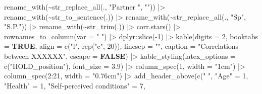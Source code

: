 \documentclass[
  bookmarksnumbered]{article}
\newenvironment{Shaded}{\begin{snugshade}}{\end{snugshade}}
\newcommand{\AttributeTok}[1]{\textcolor[rgb]{0.80,0.80,0.80}{#1}}
\newcommand{\ConstantTok}[1]{\textcolor[rgb]{0.86,0.64,0.64}{\textbf{#1}}}
\newcommand{\DecValTok}[1]{\textcolor[rgb]{0.86,0.86,0.80}{#1}}
\newcommand{\FloatTok}[1]{\textcolor[rgb]{0.75,0.75,0.82}{#1}}
\newcommand{\FunctionTok}[1]{\textcolor[rgb]{0.94,0.94,0.56}{#1}}
\newcommand{\NormalTok}[1]{\textcolor[rgb]{0.80,0.80,0.80}{#1}}
\newcommand{\OtherTok}[1]{\textcolor[rgb]{0.94,0.94,0.56}{#1}}
\newcommand{\SpecialCharTok}[1]{\textcolor[rgb]{0.86,0.64,0.64}{#1}}
\newcommand{\StringTok}[1]{\textcolor[rgb]{0.80,0.58,0.58}{#1}}
\begin{document}
\begin{Shaded}
\begin{Highlighting}[]
  \FunctionTok{rename\_with}\NormalTok{(}\SpecialCharTok{\textasciitilde{}}\FunctionTok{str\_replace\_all}\NormalTok{(., }\StringTok{"Partner "}\NormalTok{, }\StringTok{""}\NormalTok{)) }\SpecialCharTok{|\textgreater{}}
  \FunctionTok{rename\_with}\NormalTok{(}\SpecialCharTok{\textasciitilde{}}\FunctionTok{str\_to\_sentence}\NormalTok{(.)) }\SpecialCharTok{|\textgreater{}}
  \FunctionTok{rename\_with}\NormalTok{(}\SpecialCharTok{\textasciitilde{}}\FunctionTok{str\_replace\_all}\NormalTok{(., }\StringTok{"Sp"}\NormalTok{, }\StringTok{"S.P."}\NormalTok{)) }\SpecialCharTok{|\textgreater{}}
  \FunctionTok{rename\_with}\NormalTok{(}\SpecialCharTok{\textasciitilde{}}\FunctionTok{str\_trim}\NormalTok{(.)) }\SpecialCharTok{|\textgreater{}}
  \FunctionTok{corr.stars}\NormalTok{() }\SpecialCharTok{|\textgreater{}}
  \FunctionTok{rownames\_to\_column}\NormalTok{(}\AttributeTok{var =} \StringTok{" "}\NormalTok{) }\SpecialCharTok{|\textgreater{}} 
\NormalTok{  dplyr}\SpecialCharTok{::}\FunctionTok{slice}\NormalTok{(}\SpecialCharTok{{-}}\DecValTok{1}\NormalTok{) }\SpecialCharTok{|\textgreater{}} 
  \FunctionTok{kable}\NormalTok{(}\AttributeTok{digits =} \DecValTok{2}\NormalTok{,}
        \AttributeTok{booktabs =} \ConstantTok{TRUE}\NormalTok{,}
        \AttributeTok{align =} \FunctionTok{c}\NormalTok{(}\StringTok{"l"}\NormalTok{, }\FunctionTok{rep}\NormalTok{(}\StringTok{"c"}\NormalTok{, }\DecValTok{20}\NormalTok{)),}
        \AttributeTok{linesep =} \StringTok{""}\NormalTok{,}
        \AttributeTok{caption =} \StringTok{"Correlations between XXXXXX"}\NormalTok{,}
        \AttributeTok{escape =} \ConstantTok{FALSE}\NormalTok{) }\SpecialCharTok{|\textgreater{}}
  \FunctionTok{kable\_styling}\NormalTok{(}\AttributeTok{latex\_options =} \FunctionTok{c}\NormalTok{(}\StringTok{"HOLD\_position"}\NormalTok{),}
                \AttributeTok{font\_size =} \FloatTok{3.9}\NormalTok{) }\SpecialCharTok{|\textgreater{}}
  \FunctionTok{column\_spec}\NormalTok{(}\DecValTok{1}\NormalTok{, }\AttributeTok{width =} \StringTok{"1cm"}\NormalTok{) }\SpecialCharTok{|\textgreater{}}
  \FunctionTok{column\_spec}\NormalTok{(}\DecValTok{2}\SpecialCharTok{:}\DecValTok{21}\NormalTok{, }\AttributeTok{width =} \StringTok{"0.76cm"}\NormalTok{) }\SpecialCharTok{|\textgreater{}}
  \FunctionTok{add\_header\_above}\NormalTok{(}\FunctionTok{c}\NormalTok{(}\StringTok{" "}\NormalTok{, }
                     \StringTok{"Age"} \OtherTok{=} \DecValTok{1}\NormalTok{, }
                     \StringTok{"Health"} \OtherTok{=} \DecValTok{1}\NormalTok{,}
                     \StringTok{"Self{-}perceived conditions"} \OtherTok{=} \DecValTok{7}\NormalTok{,}

\end{Highlighting}
\end{Shaded}
\end{document}
